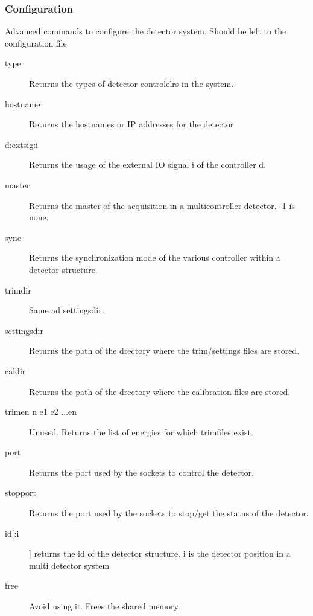 \documentclass{article}
\begin{document}
\subsubsection{Configuration}
Advanced commands to configure the detector system. Should be left to the configuration file
\begin{description}
\item[type] Returns the types of detector controlelrs in the system. 
\item[hostname] Returns the hostnames or IP addresses for the detector
\item[d:extsig:i] Returns the usage of the external IO signal i of the controller d.
\item[master] Returns the master of the acquisition in a multicontroller detector. -1 is none.
\item[sync] Returns the synchronization mode of the various controller within a detector structure. 
\item[trimdir] Same ad settingsdir.
\item[settingsdir] Returns the path of the drectory where the trim/settings files are stored.
\item[caldir]   Returns the path of the drectory where the calibration files are stored. 
\item[trimen n e1 e2 ...en] Unused. Returns the list of energies for which trimfiles exist.
\item[port] Returns the port used by the sockets to control the detector. 
\item[stopport]Returns the port used by the sockets to stop/get the status of the detector.
\item[id[:i]]        returns the id of the detector structure. i is the detector position in a multi detector system
\item[free]  Avoid using it. Frees the shared memory. 
\end{description}
\end{document}
